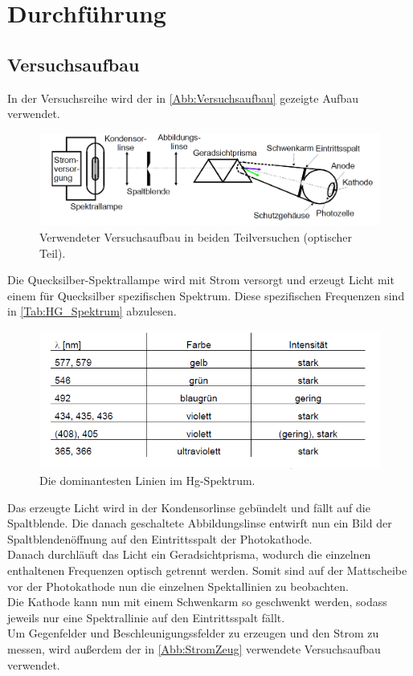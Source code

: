 \section{Durchführung}
\label{sec:Durchführung}

\subsection{Versuchsaufbau}

In der Versuchsreihe wird der in \autoref{Abb:Versuchsaufbau} gezeigte Aufbau verwendet.

\begin{figure}
    \centering
    \includegraphics[width=15cm]{Bilder/Versuchsaufbau.png}
    \caption{Verwendeter Versuchsaufbau in beiden Teilversuchen (optischer Teil).\cite{sample}}
    \label{Abb:Versuchsaufbau}
\end{figure}

Die Quecksilber-Spektrallampe wird mit Strom versorgt und erzeugt Licht mit einem für Quecksilber
spezifischen Spektrum. Diese spezifischen Frequenzen sind in \autoref{Tab:HG_Spektrum} abzulesen.

\begin{figure}
    \centering
    \includegraphics[width=15cm]{Bilder/Hg_Spektrum.png}
    \caption{Die dominantesten Linien im Hg-Spektrum.\cite{sample}}
    \label{Tab:HG_Spektrum}
\end{figure}

Das erzeugte Licht wird in der Kondensorlinse gebündelt und fällt auf die Spaltblende. 
Die danach geschaltete Abbildungslinse entwirft nun ein Bild der Spaltblendenöffnung
auf den Eintrittsspalt der Photokathode.\\
Danach durchläuft das Licht ein Geradsichtprisma, wodurch die einzelnen enthaltenen Frequenzen
optisch getrennt werden. Somit sind auf der Mattscheibe vor der Photokathode nun die einzelnen
Spektallinien zu beobachten.\\
Die Kathode kann nun mit einem Schwenkarm so geschwenkt werden, sodass jeweils nur eine 
Spektrallinie auf den Eintrittsspalt fällt.\\
Um Gegenfelder und Beschleunigungssfelder zu erzeugen und den Strom zu messen, wird außerdem
der in \autoref{Abb:StromZeug} verwendete Versuchsaufbau verwendet.

